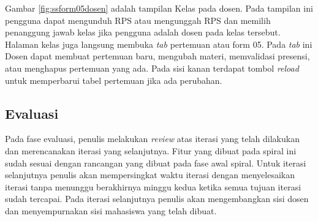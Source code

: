 Gambar \ref{fig:ssform05dosen} adalah tampilan Kelas pada dosen. Pada tampilan ini pengguna dapat mengunduh RPS atau mengunggah RPS dan memilih penanggung jawab kelas jika pengguna adalah dosen pada kelas tersebut. Halaman kelas juga langsung membuka \textit{tab} pertemuan atau form 05. Pada \textit{tab} ini Dosen dapat membuat pertemuan baru, mengubah materi, memvalidasi presensi, atau menghapus pertemuan yang ada. Pada sisi kanan terdapat tombol \textit{reload} untuk memperbarui tabel pertemuan jika ada perubahan.

\subsection{Evaluasi}
	Pada fase evaluasi, penulis melakukan \textit{review} atas iterasi yang telah dilakukan dan merencanakan iterasi yang selanjutnya. Fitur yang dibuat pada spiral ini sudah sesuai dengan rancangan yang dibuat pada fase awal spiral. Untuk iterasi selanjutnya penulis akan mempersingkat waktu iterasi dengan menyelesaikan iterasi tanpa menunggu berakhirnya minggu kedua ketika semua tujuan iterasi sudah tercapai. Pada iterasi selanjutnya penulis akan mengembangkan sisi dosen dan menyempurnakan sisi mahasiswa yang telah dibuat.

